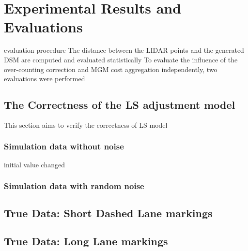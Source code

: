 
\chapter{Experimental Results and Evaluations}
\label{chap:k3}

evaluation procedure
The distance between the LIDAR points and the generated DSM are computed and evaluated statistically
To evaluate the influence of the over-counting correction and MGM
cost aggregation independently, two evaluations were performed






\section{The Correctness of the LS adjustment model}

This section aims to verify the correctness of LS model

\subsection{Simulation data without noise}
initial value changed

\subsection{Simulation data with random noise}




\section{True Data: Short Dashed Lane markings}



\section{True Data: Long Lane markings}



